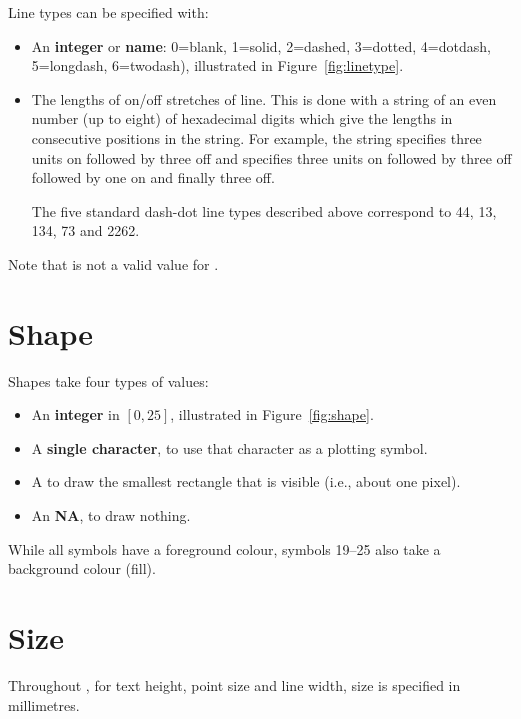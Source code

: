 Line types can be specified with: 

\begin{itemize}
  \item An {\bf integer} or {\bf name}: 0=blank, 1=solid, 2=dashed, 3=dotted, 4=dotdash, 5=longdash, 6=twodash), illustrated in Figure~\ref{fig:linetype}.

  \item The lengths of on/off stretches of line. This is done with a string of an even number (up to eight) of hexadecimal digits which give the lengths in consecutive positions in the string. For example, the string  specifies three units on followed by three off and  specifies three units on followed by three off followed by one on and finally three off. 
  
  The five standard dash-dot line types described above correspond to 44, 13, 134, 73 and 2262.
\end{itemize} 

Note that  is not a valid value for .

\section{Shape}
\label{sec:shape_spec}

Shapes take four types of values: 

\begin{itemize}
  \item An {\bf integer} in $[0, 25]$, illustrated in Figure~\ref{fig:shape}.

  \item A {\bf single character}, to use that character as a plotting symbol.   

  \item A  to draw the smallest rectangle that is visible (i.e., about one pixel).
  
  \item An {\bf NA}, to draw nothing.
\end{itemize}

While all symbols have a foreground colour, symbols 19--25 also take a background colour (fill). 

\section{Size}
\label{sec:size}

Throughout \ggplot, for text height, point size and line width, size is specified in millimetres. 

